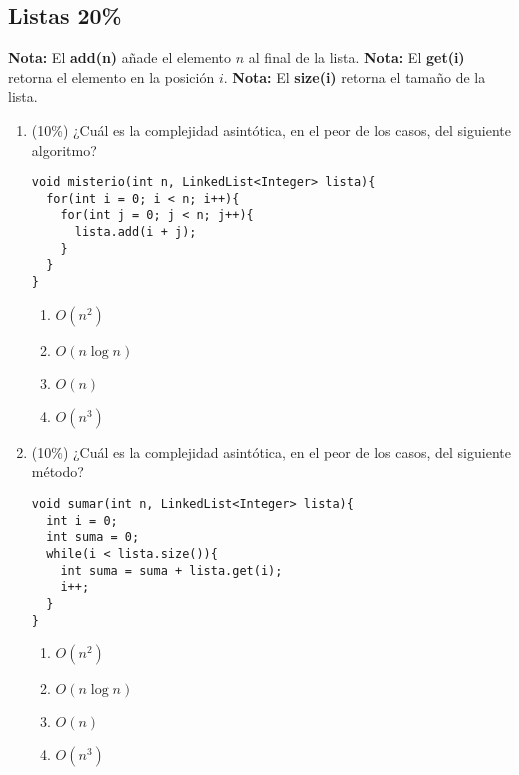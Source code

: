 \documentclass[10 pt]{article}
\begin{document}
\begin{multicols}{2}
\section{Listas 20\%}
\textbf{Nota: } El \textbf{add(n)} añade el elemento $n$ al final de la lista.
\textbf{Nota: } El \textbf{get(i)} retorna el elemento en la posición $i$.
\textbf{Nota: } El \textbf{size(i)} retorna el tamaño de la lista.
\begin{enumerate}[label=\alph*]
\item (10\%) ¿Cuál es la complejidad asintótica, en el peor de los casos, del siguiente algoritmo?
\begin{lstlisting}
void misterio(int n, LinkedList<Integer> lista){
  for(int i = 0; i < n; i++){
    for(int j = 0; j < n; j++){
      lista.add(i + j);    
    }  
  }
}
\end{lstlisting}
\begin{enumerate}[label=\roman*]
\item $O(n^2)$
\item $O(n \log n)$
\item $O(n)$
\item $O(n^3)$
\end{enumerate}
\item (10\%) ¿Cuál es la complejidad asintótica, en el peor de los casos, del siguiente método?
\begin{lstlisting}
void sumar(int n, LinkedList<Integer> lista){
  int i = 0;
  int suma = 0;
  while(i < lista.size()){
    int suma = suma + lista.get(i);
    i++;
  }
}
\end{lstlisting}
\begin{enumerate}[label=\roman*]
\item $O(n ^ 2)$
\item $O(n \log n)$
\item $O(n)$
\item $O(n^3)$
\end{enumerate}
\end{enumerate}
\end{multicols}
\end{document}
